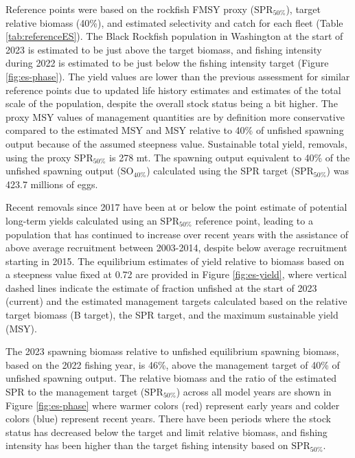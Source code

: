 \documentclass[11pt,
  english,
  letterpaper,
]{article}
\begin{document}
Reference points were based on the rockfish FMSY proxy (\(\text{SPR}_{50\%}\)), target relative biomass (40\%), and estimated selectivity and catch for each fleet (Table \ref{tab:referenceES}). The Black Rockfish population in Washington at the start of 2023 is estimated to be just above the target biomass, and fishing intensity during 2022 is estimated to be just below the fishing intensity target (Figure \ref{fig:es-phase}). The yield values are lower than the previous assessment for similar reference points due to updated life history estimates and estimates of the total scale of the population, despite the overall stock status being a bit higher. The proxy MSY values of management quantities are by definition more conservative compared to the estimated MSY and MSY relative to 40\% of unfished spawning output because of the assumed steepness value. Sustainable total yield, removals, using the proxy \(\text{SPR}_{50\%}\) is 278 mt. The spawning output equivalent to 40\% of the unfished spawning output (\(\text{SO}_{40\%}\)) calculated using the SPR target (\(\text{SPR}_{50\%}\)) was 423.7 millions of eggs.

Recent removals since 2017 have been at or below the point estimate of potential long-term yields calculated using an \(\text{SPR}_{50\%}\) reference point, leading to a population that has continued to increase over recent years with the assistance of above average recruitment between 2003-2014, despite below average recruitment starting in 2015. The equilibrium estimates of yield relative to biomass based on a steepness value fixed at 0.72 are provided in Figure \ref{fig:es-yield}, where vertical dashed lines indicate the estimate of fraction unfished at the start of 2023 (current) and the estimated management targets calculated based on the relative target biomass (B target), the SPR target, and the maximum sustainable yield (MSY).

The 2023 spawning biomass relative to unfished equilibrium spawning biomass, based on the 2022 fishing year, is 46\%, above the management target of 40\% of unfished spawning output. The relative biomass and the ratio of the estimated SPR to the management target (\(\text{SPR}_{50\%}\)) across all model years are shown in Figure \ref{fig:es-phase} where warmer colors (red) represent early years and colder colors (blue) represent recent years. There have been periods where the stock status has decreased below the target and limit relative biomass, and fishing intensity has been higher than the target fishing intensity based on \(\text{SPR}_{50\%}\).
\end{document}
